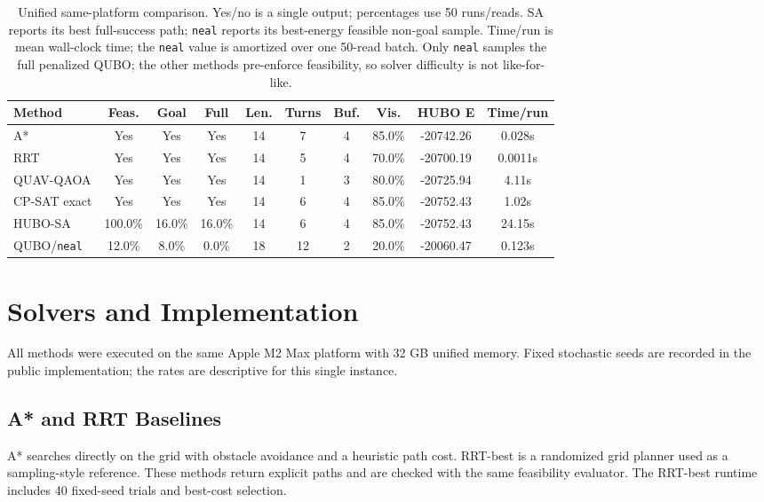 \documentclass[letterpaper]{article} %
\begin{document}
\begin{table}[t]
\centering
\small
\begin{tabular*}{\textwidth}{@{\extracolsep{\fill}}lccccccccc@{}}
\toprule
Method & Feas. & Goal & Full & Len. & Turns & Buf. & Vis. & HUBO E & Time/run\\
\midrule
A* & Yes & Yes & Yes & 14 & 7 & 4 & 85.0\% & -20742.26 & 0.028s\\
RRT & Yes & Yes & Yes & 14 & 5 & 4 & 70.0\% & -20700.19 & 0.0011s\\
QUAV-QAOA & Yes & Yes & Yes & 14 & 1 & 3 & 80.0\% & -20725.94 & 4.11s\\
CP-SAT exact & Yes & Yes & Yes & 14 & 6 & 4 & 85.0\% & -20752.43 & 1.02s\\
HUBO-SA & 100.0\% & 16.0\% & 16.0\% & 14 & 6 & 4 & 85.0\% & -20752.43 & 24.15s\\
QUBO/\texttt{neal} & 12.0\% & 8.0\% & 0.0\% & 18 & 12 & 2 & 20.0\% & -20060.47 & 0.123s\\
\bottomrule
\end{tabular*}
\caption{Unified same-platform comparison. Yes/no is a single output; percentages use 50 runs/reads. SA reports its best full-success path; \texttt{neal} reports its best-energy feasible non-goal sample. Time/run is mean wall-clock time; the \texttt{neal} value is amortized over one 50-read batch. Only \texttt{neal} samples the full penalized QUBO; the other methods pre-enforce feasibility, so solver difficulty is not like-for-like.}
\label{tab:unified}
\end{table}

\section{Solvers and Implementation}
All methods were executed on the same Apple M2 Max platform with 32 GB unified memory.
Fixed stochastic seeds are recorded in the public implementation; the rates are descriptive for this single instance.

\subsection{A* and RRT Baselines}
A* searches directly on the grid with obstacle avoidance and a heuristic path cost. RRT-best is a randomized grid planner used as a sampling-style reference. These methods return explicit paths and are checked with the same feasibility evaluator. The RRT-best runtime includes 40 fixed-seed trials and best-cost selection.
\end{document}
